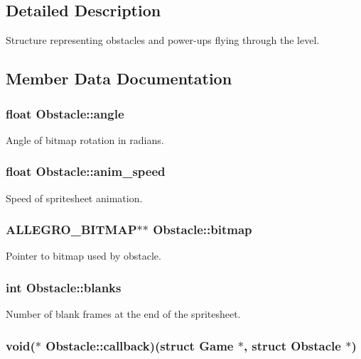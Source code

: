 \subsection{Detailed Description}
Structure representing obstacles and power-\/ups flying through the level. 

\subsection{Member Data Documentation}
\hypertarget{structObstacle_a99d85ef4e92f7e899b49ac85b2e1dbdc}{
\subsubsection[{angle}]{\setlength{\rightskip}{0pt plus 5cm}float Obstacle\+::angle}}\label{structObstacle_a99d85ef4e92f7e899b49ac85b2e1dbdc}
Angle of bitmap rotation in radians. \hypertarget{structObstacle_a96a13e4704e4643291989193a112366a}{
\subsubsection[{anim\+\_\+speed}]{\setlength{\rightskip}{0pt plus 5cm}float Obstacle\+::anim\+\_\+speed}}\label{structObstacle_a96a13e4704e4643291989193a112366a}
Speed of spritesheet animation. \hypertarget{structObstacle_a1f35f88fe8f6d0664da082f82ae4b774}{
\subsubsection[{bitmap}]{\setlength{\rightskip}{0pt plus 5cm}A\+L\+L\+E\+G\+R\+O\+\_\+\+B\+I\+T\+M\+A\+P$\ast$$\ast$ Obstacle\+::bitmap}}\label{structObstacle_a1f35f88fe8f6d0664da082f82ae4b774}
Pointer to bitmap used by obstacle. \hypertarget{structObstacle_a862f4038bd63057d91406720bb586a9c}{
\subsubsection[{blanks}]{\setlength{\rightskip}{0pt plus 5cm}int Obstacle\+::blanks}}\label{structObstacle_a862f4038bd63057d91406720bb586a9c}
Number of blank frames at the end of the spritesheet. \hypertarget{structObstacle_a21b4ff0edaa2dc5394ff7a6328e48358}{
\subsubsection[{callback}]{\setlength{\rightskip}{0pt plus 5cm}void($\ast$ Obstacle\+::callback)(struct {\bf Game} $\ast$, struct {\bf Obstacle} $\ast$)}}\label{structObstacle_a21b4ff0edaa2dc5394ff7a6328e48358}
